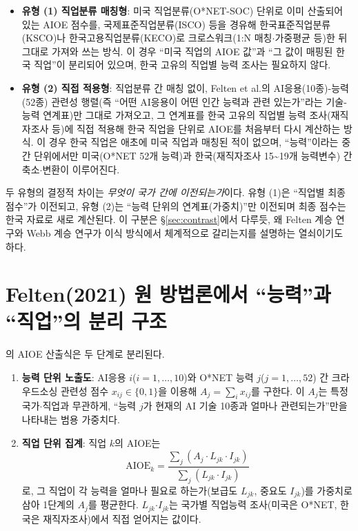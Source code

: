 \documentclass[11pt]{article}
\begin{document}
\begin{itemize}
  \item \textbf{유형 (1) 직업분류 매칭형}: 미국 직업분류(O*NET-SOC) 단위로 이미 산출되어 있는 AIOE 점수를, 국제표준직업분류(ISCO) 등을 경유해 한국표준직업분류(KSCO)나 한국고용직업분류(KECO)로 크로스워크(1:N 매칭$\cdot$가중평균 등)한 뒤 그대로 가져와 쓰는 방식. 이 경우 ``미국 직업의 AIOE 값''과 ``그 값이 매핑된 한국 직업''이 분리되어 있으며, 한국 고유의 직업별 능력 조사는 필요하지 않다.
  \item \textbf{유형 (2) 직접 적용형}: 직업분류 간 매칭 없이, Felten et al.의 AI응용(10종)-능력(52종) 관련성 행렬(즉 ``어떤 AI응용이 어떤 인간 능력과 관련 있는가''라는 기술-능력 연계표)만 그대로 가져오고, 그 연계표를 한국 고유의 직업별 능력 조사(재직자조사 등)에 직접 적용해 한국 직업을 단위로 AIOE를 처음부터 다시 계산하는 방식. 이 경우 한국 직업은 애초에 미국 직업과 매칭된 적이 없으며, ``능력''이라는 중간 단위에서만 미국(O*NET 52개 능력)과 한국(재직자조사 15\textasciitilde 19개 능력변수) 간 축소$\cdot$변환이 이루어진다.
\end{itemize}

두 유형의 결정적 차이는 \emph{무엇이 국가 간에 이전되는가}이다. 유형 (1)은 ``직업별 최종 점수''가 이전되고, 유형 (2)는 ``능력 단위의 연계표(가중치)''만 이전되며 최종 점수는 한국 자료로 새로 계산된다. 이 구분은 \S\ref{sec:contrast}에서 다루듯, 왜 Felten 계승 연구와 Webb 계승 연구가 이식 방식에서 체계적으로 갈리는지를 설명하는 열쇠이기도 하다.

\section{Felten(2021) 원 방법론에서 ``능력''과 ``직업''의 분리 구조}

\citet{felten-2021-occupational-industry-and-geographic-exposure}의 AIOE 산출식은 두 단계로 분리된다.

\begin{enumerate}[label=\arabic*.]
  \item \textbf{능력 단위 노출도}: AI응용 $i$($i=1,\dots,10$)와 O*NET 능력 $j$($j=1,\dots,52$) 간 크라우드소싱 관련성 점수 $x_{ij}\in\{0,1\}$을 이용해 $A_j = \sum_i x_{ij}$를 구한다. 이 $A_j$는 특정 국가$\cdot$직업과 무관하게, ``능력 $j$가 현재의 AI 기술 10종과 얼마나 관련되는가''만을 나타내는 범용 가중치다.
  \item \textbf{직업 단위 집계}: 직업 $k$의 AIOE는
  \[
  \text{AIOE}_k = \frac{\sum_j (A_j \cdot L_{jk} \cdot I_{jk})}{\sum_j (L_{jk} \cdot I_{jk})}
  \]
  로, 그 직업이 각 능력을 얼마나 필요로 하는가(보급도 $L_{jk}$, 중요도 $I_{jk}$)를 가중치로 삼아 1단계의 $A_j$를 평균한다. $L_{jk}$$\cdot$$I_{jk}$는 국가별 직업능력 조사(미국은 O*NET, 한국은 재직자조사)에서 직접 얻어지는 값이다.
\end{enumerate}
\end{document}
